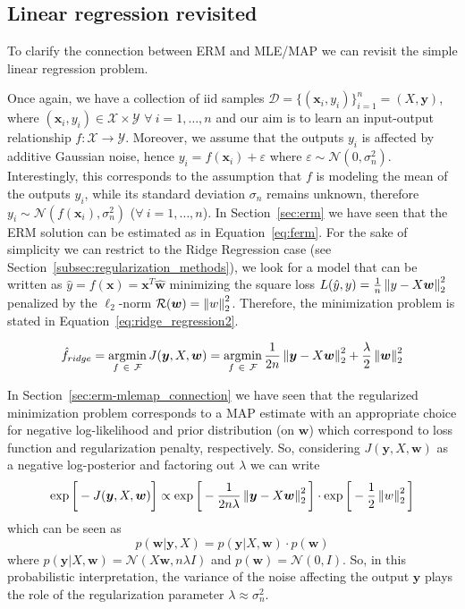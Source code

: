 \subsection{Linear regression revisited} \label{subsec:linear_regression_revisited}

To clarify the connection between ERM and MLE/MAP we can revisit the simple linear regression problem.

Once again, we have a collection of \ac{iid} samples $\mathcal{D}=\{(\bm{x}_i,y_i)\}_{i=1}^n = (X, \bm{y})$, where $(\bm{x}_i,y_i) \in \mathcal{X} \times \mathcal{Y}$ $\forall~i=1,\dots,n$ and our aim is to learn an input-output relationship $f: \mathcal{X} \rightarrow \mathcal{Y}$.
Moreover, we assume that the outputs $y_i$ is affected by additive Gaussian noise, hence $y_i = f(\bm{x}_i) + \varepsilon$ where $\varepsilon \sim \mathcal{N}(0,\sigma_n^2)$.
Interestingly, this corresponds to the assumption that $f$ is modeling the mean of the outputs $y_i$, while its standard deviation $\sigma_n$ remains unknown, therefore $y_i \sim \mathcal{N}(f(\bm{x}_i), \sigma_n^2)$ ($\forall~i=1,\dots,n$).
In Section~\ref{sec:erm} we have seen that the ERM solution can be estimated as in Equation~\ref{eq:ferm}. For the sake of simplicity we can restrict to the Ridge Regression  case (see Section~\ref{subsec:regularization_methods}), \ie we look for a model that can be written as $\hat y = f(\bm{x}) = \bm{x}^T \bm{ \hat w}$ minimizing the square loss $L(\hat y,y) = \frac{1}{n} \left\lVert y - X\bm{w}\right\rVert_2^2$ penalized by the $\ell_2$-norm $\mathcal{R}(\bm{w}) = \left\lVert w\right\rVert_2^2$.
Therefore, the minimization problem is stated in Equation~\eqref{eq:ridge_regression2}.

\begin{equation} \label{eq:ridge_regression2}
	\hat f_{ridge} = \mathop{\mathrm{argmin}}\limits_{f~\in~\mathcal{F}} J(\bm{y}, X, \bm{w}) = \mathop{\mathrm{argmin}}\limits_{f~\in~\mathcal{F}}\frac{1}{2n} \left\lVert\bm{y} - X\bm{w}\right\rVert_2^2+\frac{\lambda}{2}\left\lVert\bm{w}\right\rVert_2^2
\end{equation}

In Section~\ref{sec:erm-mlemap_connection} we have seen that the regularized minimization problem corresponds to a MAP estimate with an appropriate choice for negative log-likelihood and prior distribution (on $\bm{w}$) which correspond to loss function and regularization penalty, respectively. So, considering $J(\bm{y}, X, \bm{w})$ as a negative log-posterior and factoring out $\lambda$ we can write
$$
\exp{\bigg[-J(\bm{y}, X, \bm{w})\bigg]} \propto \exp \bigg[ -\frac{1}{2n\lambda} \left\lVert\bm{y}-X\bm{w}\right\rVert_2^2 \bigg] \cdot \exp{\bigg[-\frac{1}{2}\left\lVert w\right\rVert_2^2 \bigg]}
$$
which can be seen as
$$
p(\bm{w}|\bm{y},X) = p(\bm{y}|X,\bm{w}) \cdot p(\bm{w})
$$
where $p(\bm{y}|X,\bm{w}) = \mathcal{N}(X\bm{w},n \lambda I)$ and $p(\bm{w}) = \mathcal{N}(0,I)$. So, in this probabilistic interpretation, the variance of the noise affecting the output $\bm{y}$ plays the role of the regularization parameter $\lambda \approx \sigma_n^2$.



